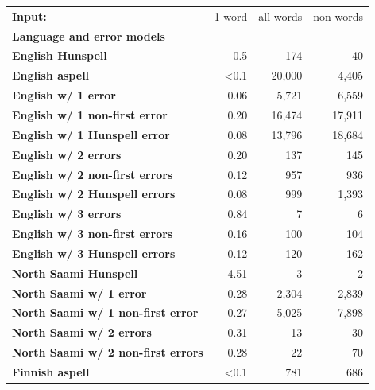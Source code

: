 \documentclass[a4paper,12pt]{article}
\begin{document}
\begin{table}
    \centering
    \begin{tabular}{|l|r|r|r|}
        \hline
        \bf Input:                    & 1 word & all words & non-words \\
        \bf Language and error models &        &           &           \\
        \hline
        \bf English Hunspell & 0.5 & 174 & 40 \\
          \bf English aspell & <0.1 & 20,000 & 4,405 \\
        \hline
        \bf English w/ 1 error     & 0.06  & 5,721  & 6,559 \\
 \bf English w/ 1 non-first error  & 0.20  & 16,474 & 17,911  \\
 \bf English w/ 1 Hunspell error   & 0.08  & 13,796 & 18,684  \\
     \bf English w/ 2 errors       & 0.20  & 137    & 145  \\
 \bf English w/ 2 non-first errors & 0.12  & 957    & 936 \\
 \bf English w/ 2 Hunspell errors  & 0.08  & 999    & 1,393 \\
   \bf English w/ 3 errors         & 0.84  & 7      & 6    \\
 \bf English w/ 3 non-first errors & 0.16  & 100    & 104  \\
 \bf English w/ 3 Hunspell errors  & 0.12  & 120    & 162  \\
        \hline
   \bf North Saami Hunspell & 4.51 & 3 & 2 \\
        \hline
        \bf North Saami w/ 1 error    & 0.28 & 2,304 & 2,839 \\
\bf North Saami w/ 1 non-first error  & 0.27 & 5,025 & 7,898 \\
       \bf North Saami w/ 2 errors    & 0.31 & 13    & 30    \\
\bf North Saami w/ 2 non-first errors & 0.28 & 22    & 70    \\
        \hline
        \bf Finnish aspell & <0.1 &  781 & 686 \\
        \hline

\end{tabular}
\end{table}
\end{document}
